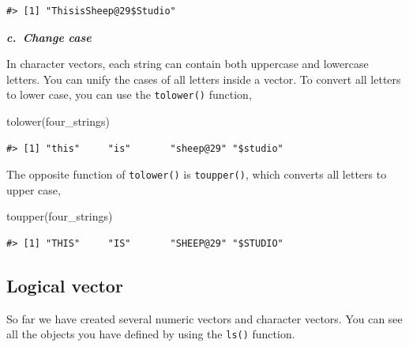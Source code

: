 \documentclass[
]{book}
\newenvironment{Shaded}{\begin{snugshade}}{\end{snugshade}}
\newcommand{\FunctionTok}[1]{\textcolor[rgb]{0.00,0.00,0.00}{#1}}
\newcommand{\NormalTok}[1]{#1}
\newcommand{\OtherTok}[1]{\textcolor[rgb]{0.56,0.35,0.01}{#1}}
\newcommand{\StringTok}[1]{\textcolor[rgb]{0.31,0.60,0.02}{#1}}
\begin{document}
\begin{Shaded}
\end{Shaded}

\begin{verbatim}
#> [1] "ThisisSheep@29$Studio"
\end{verbatim}

\textbf{\emph{c.~Change case}}

In character vectors, each string can contain both uppercase and lowercase letters. You can unify the cases of all letters inside a vector. To convert all letters to lower case, you can use the \texttt{tolower()} function,

\begin{Shaded}
\begin{Highlighting}[]
\FunctionTok{tolower}\NormalTok{(four\_strings)}
\end{Highlighting}
\end{Shaded}

\begin{verbatim}
#> [1] "this"     "is"       "sheep@29" "$studio"
\end{verbatim}

The opposite function of \texttt{tolower()} is \texttt{toupper()}, which converts all letters to upper case,

\begin{Shaded}
\begin{Highlighting}[]
\FunctionTok{toupper}\NormalTok{(four\_strings)}
\end{Highlighting}
\end{Shaded}

\begin{verbatim}
#> [1] "THIS"     "IS"       "SHEEP@29" "$STUDIO"
\end{verbatim}

\hypertarget{logical-vector}{%
\subsection{Logical vector}\label{logical-vector}}

So far we have created several numeric vectors and character vectors. You can see all the objects you have defined by using the \texttt{ls()} function.
\end{document}
